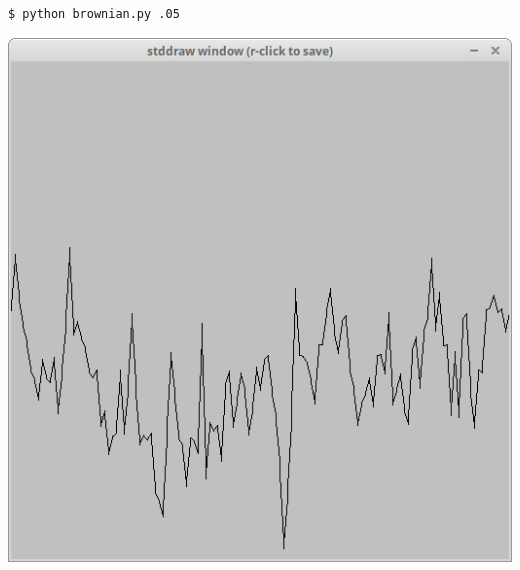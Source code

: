 \documentclass[8pt,a4paper,compress,handout]{beamer}
\begin{document}
\begin{frame}[fragile]
\begin{minipage}{160pt}
\begin{lstlisting}[language={}]
$ python brownian.py .05
\end{lstlisting}
\end{minipage}%
\begin{minipage}{140pt}
\hfill \includegraphics[scale=0.15]{figures/brownian3.png}
\end{minipage}
\end{frame}
\end{document}
